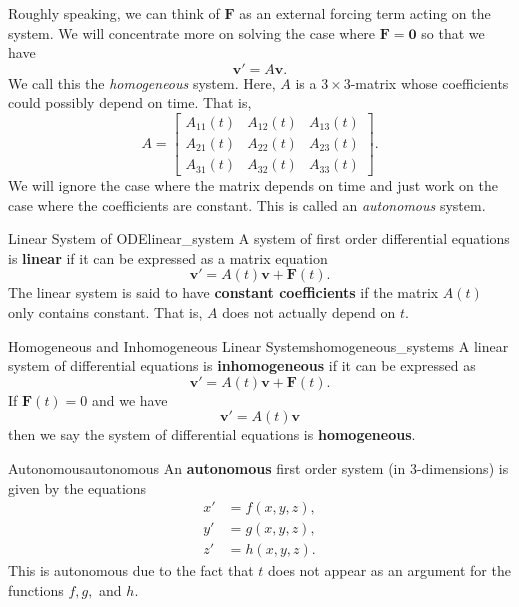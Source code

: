         Roughly speaking, we can think of $\mathbf{F}$ as an external forcing term acting on the system.  We will concentrate more on solving the case where $\mathbf{F}=\mathbf{0}$ so that we have
        \[
        \mathbf{v}'=A\mathbf{v}.
        \]
        We call this the \emph{homogeneous} system. Here, $A$ is a $3\times 3$-matrix whose coefficients could possibly depend on time.  That is,
        \[
        A = \begin{bmatrix} A_{11}(t) & A_{12}(t) & A_{13}(t)\\
        A_{21}(t) & A_{22}(t) & A_{23}(t)\\
        A_{31}(t) & A_{32}(t) & A_{33}(t)\end{bmatrix}.
        \]
        We will ignore the case where the matrix depends on time and just work on the case where the coefficients are constant. This is called an \emph{autonomous} system.
        
        \begin{df}{Linear System of ODE}{linear_system}
            A system of first order differential equations is \textbf{linear} if it can be expressed as a matrix equation
            \[
            \mathbf{v}' = A(t)\mathbf{v}+\mathbf{F}(t).
            \]
            The linear system is said to have \textbf{constant coefficients} if the matrix $A(t)$ only contains constant.  That is, $A$ does not actually depend on $t$.
        \end{df}
        
        \begin{df}{Homogeneous and Inhomogeneous Linear Systems}{homogeneous_systems}
            A linear system of differential equations is 
            \textbf{inhomogeneous} if it can be expressed as
            \[
            \mathbf{v}' = A(t)\mathbf{v}+\mathbf{F}(t).
            \]
            If $\mathbf{F}(t)=0$ and we have
            \[
            \mathbf{v}' = A(t)\mathbf{v}
            \]
            then we say the system of differential equations is \textbf{homogeneous}.
        \end{df}
        
        \begin{df}{Autonomous}{autonomous}
        An \textbf{autonomous} first order system (in 3-dimensions) is given by the equations
        \begin{align*}
        x' &= f(x,y,z),\\
        y' &= g(x,y,z),\\
        z' &= h(x,y,z).
        \end{align*}
        This is autonomous due to the fact that $t$ does not appear as an argument for the functions $f,g,$ and $h$.
        \end{df}
        
